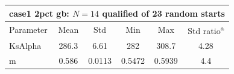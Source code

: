 \begin{tabular}{lccccc}
\toprule
\multicolumn{6}{l}{case1 2pct gb: $N=14$ qualified of 23 random starts} \\
\midrule
Parameter & Mean & Std & Min & Max & Std ratio\textsuperscript{a} \\
\midrule
  KsAlpha & \num{286.3} & \num{6.61} & \num{282} & \num{308.7} & \num{4.28} \\
  m & \num{0.586} & \num{0.0113} & \num{0.5472} & \num{0.5939} & \num{4.4} \\
\bottomrule
\end{tabular}
